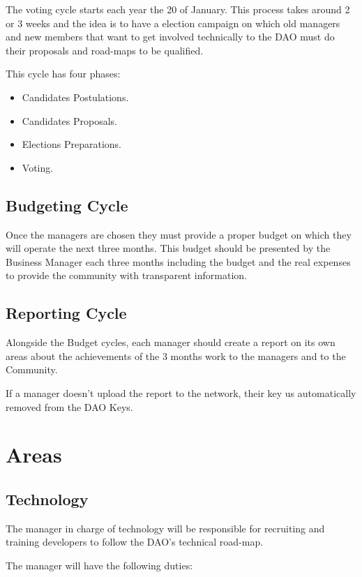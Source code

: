 \documentclass{article}
\begin{document}
The voting cycle starts each year the 20 of January. This process takes around 2 or 3 weeks and the idea is to have a election campaign on which old managers and new members that want to get involved technically to the DAO must do their proposals and road-maps to be qualified.

This cycle has four phases:

\begin{itemize}
  \item Candidates Postulations.
  \item Candidates Proposals.
  \item Elections Preparations.
  \item Voting.
\end{itemize}

\subsection{Budgeting Cycle}

Once the managers are chosen they must provide a proper budget on which they will operate the next three months. This budget should be presented by the Business Manager each three months including the budget and the real expenses to provide the community with transparent information.

\subsection{Reporting Cycle}

Alongside the Budget cycles, each manager should create a report on its own areas about the achievements of the 3 months work to the managers and to the Community.

If a manager doesn't upload the report to the network, their key us automatically removed from the DAO Keys.

\section{Areas}

\subsection{Technology}

The manager in charge of technology will be responsible for recruiting and training developers to follow the DAO's technical road-map.

The manager will have the following duties:
\end{document}
